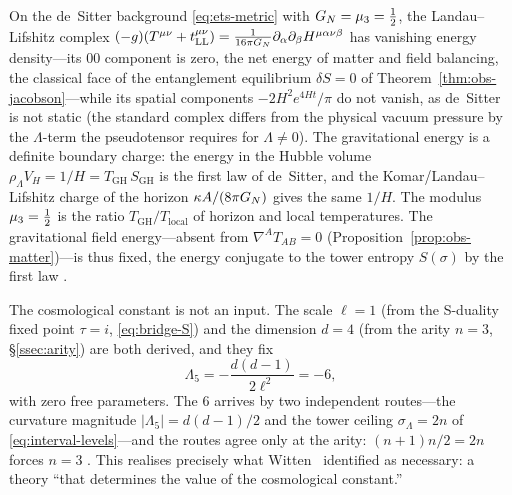 \begin{theorem}\label{thm:LL-energy}
On the de~Sitter background \eqref{eq:ets-metric} with $G_{N}=\mu_{3}=\tfrac12$, the Landau--Lifshitz complex $(-g)(T^{\mu\nu}+t_{\mathrm{LL}}^{\mu\nu})=\tfrac1{16\pi G_{N}}\partial_\alpha\partial_\beta H^{\mu\alpha\nu\beta}$ has vanishing energy density---its $00$ component is zero, the net energy of matter and field balancing, the classical face of the entanglement equilibrium $\delta S=0$ of Theorem~\ref{thm:obs-jacobson}---while its spatial components $-2H^{2}e^{4Ht}/\pi$ do not vanish, as de~Sitter is not static (the standard complex differs from the physical vacuum pressure by the $\Lambda$-term the pseudotensor requires for $\Lambda\neq0$). The gravitational energy is a definite boundary charge: the energy in the Hubble volume $\rho_\Lambda V_H=1/H=T_{\mathrm{GH}}\,S_{\mathrm{GH}}$ is the first law of de~Sitter, and the Komar/Landau--Lifshitz charge of the horizon $\kappa A/(8\pi G_{N})$ gives the same $1/H$. The modulus $\mu_{3}=\tfrac12$ is the ratio $T_{\mathrm{GH}}/T_{\mathrm{local}}$ of horizon and local temperatures. The gravitational field energy---absent from $\nabla^{A}T_{AB}=0$ (Proposition~\ref{prop:obs-matter})---is thus fixed, the energy conjugate to the tower entropy $S(\sigma)$ by the first law .

\end{theorem}\begin{remark}
\label{rmk:GLambda-interval}
The cosmological constant is not an input. The scale $\ell=1$ (from the
S-duality fixed point $\tau=i$, \eqref{eq:bridge-S}) and the dimension $d=4$
(from the arity $n=3$, \S\ref{ssec:arity}) are both derived, and they fix
\begin{equation}\label{lambda5_from_curvature}
  \Lambda_5=-\frac{d(d-1)}{2\ell^{2}}=-6 ,
\end{equation}
with zero free parameters. The $6$ arrives by two independent routes---the curvature magnitude
$|\Lambda_5|=d(d-1)/2$ and the tower ceiling $\sigma_\Lambda=2n$ of \eqref{eq:interval-levels}---and
the routes agree only at the arity: $(n{+}1)n/2=2n$ forces $n=3$ .
This realises precisely what
Witten~\cite{Witten01dS} identified as necessary: a theory
``that determines the value of the cosmological constant.''


\end{remark}
